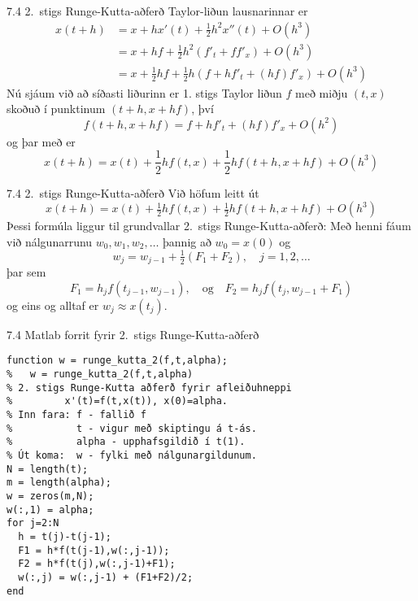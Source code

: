 \begin{frame}{7.4 2.~stigs Runge-Kutta-aðferð} 
Taylor-liðun lausnarinnar er 
\begin{align*}
  x(t+h) &= x + hx'(t) + \frac{1}{2} h^2 x''(t) + O(h^3) \\
  &= x + hf + \frac{1}{2} h^2 ( f'_t + f f'_x ) + O(h^3) \\
  &= x + \frac{1}{2}hf + \frac{1}{2}h( f + hf'_t + (hf)f'_x) + O(h^3)
\end{align*}
Nú sjáum við að síðasti liðurinn er 1. stigs Taylor 
liðun $f$ með miðju $(t,x)$ skoðuð í punktinum $(t+h,x+hf)$, því
\begin{equation*}
  f(t+h,x + hf) = f + hf'_t + (hf) f'_x + O(h^2)
\end{equation*}
og þar með er
\begin{equation*}
  x(t+h) = x(t) + \frac{1}{2} hf(t,x) + \frac{1}{2} hf(t+h,x+hf) + O(h^3)
\end{equation*}
\end{frame}


\begin{frame}{7.4 2.~stigs Runge-Kutta-aðferð} 
Við höfum leitt út
\begin{equation*}
  x(t+h) = x(t) + \tfrac{1}{2} hf(t,x) + \tfrac{1}{2} hf(t+h,x+hf) + O(h^3)
\end{equation*}
Þessi formúla liggur til grundvallar 
2.~stigs Runge-Kutta-aðferð:
Með henni fáum við nálgunarrunu $w_0, w_1, w_2, \ldots$ þannig að
$w_0=x(0)$ og 
\begin{equation*}
  w_j = w_{j-1} + \tfrac{1}{2}(F_1 + F_2), \quad j = 1,2,\ldots
\end{equation*}
þar sem
\begin{equation*}
  F_1 = h_jf(t_{j-1},w_{j-1}),
  \quad \text{og} \quad
  F_2 = h_jf(t_j,w_{j-1}+F_1)
\end{equation*}
og eins og alltaf er $w_j \approx x(t_j)$.
\end{frame}


\begin{frame}[fragile]{7.4 Matlab forrit fyrir 2.~stigs Runge-Kutta-aðferð} 
\begin{verbatim}
function w = runge_kutta_2(f,t,alpha);
%   w = runge_kutta_2(f,t,alpha)
% 2. stigs Runge-Kutta aðferð fyrir afleiðuhneppi 
%         x'(t)=f(t,x(t)), x(0)=alpha. 
% Inn fara: f - fallið f 
%           t - vigur með skiptingu á t-ás. 
%           alpha - upphafsgildið í t(1). 
% Út koma:  w - fylki með nálgunargildunum. 
N = length(t);   
m = length(alpha); 
w = zeros(m,N);  
w(:,1) = alpha; 
for j=2:N 
  h = t(j)-t(j-1);
  F1 = h*f(t(j-1),w(:,j-1));
  F2 = h*f(t(j),w(:,j-1)+F1); 
  w(:,j) = w(:,j-1) + (F1+F2)/2; 
end 
\end{verbatim}
\end{frame}

